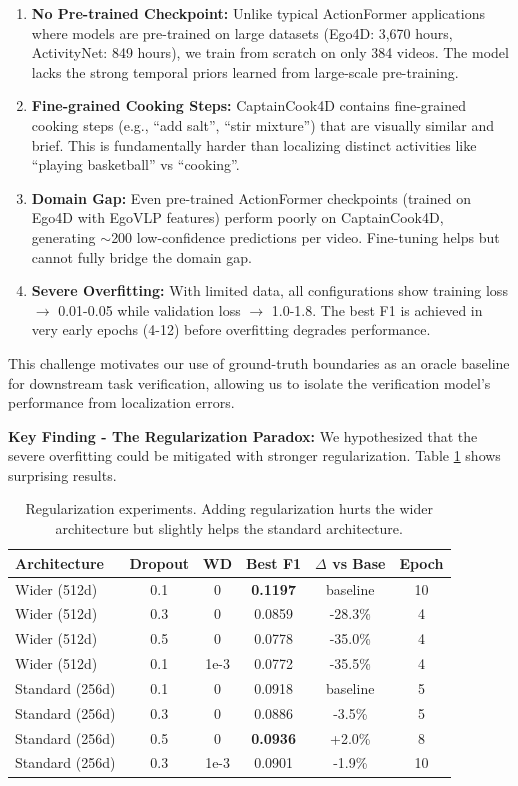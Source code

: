 \documentclass[10pt,twocolumn,letterpaper]{article}
\begin{document}
\begin{enumerate}
    \item \textbf{No Pre-trained Checkpoint:} Unlike typical ActionFormer applications where models are pre-trained on large datasets (Ego4D: 3,670 hours, ActivityNet: 849 hours), we train from scratch on only 384 videos. The model lacks the strong temporal priors learned from large-scale pre-training.
    
    \item \textbf{Fine-grained Cooking Steps:} CaptainCook4D contains fine-grained cooking steps (e.g., ``add salt'', ``stir mixture'') that are visually similar and brief. This is fundamentally harder than localizing distinct activities like ``playing basketball'' vs ``cooking''.
    
    \item \textbf{Domain Gap:} Even pre-trained ActionFormer checkpoints (trained on Ego4D with EgoVLP features) perform poorly on CaptainCook4D, generating $\sim$200 low-confidence predictions per video. Fine-tuning helps but cannot fully bridge the domain gap.
    
    \item \textbf{Severe Overfitting:} With limited data, all configurations show training loss $\rightarrow$ 0.01-0.05 while validation loss $\rightarrow$ 1.0-1.8. The best F1 is achieved in very early epochs (4-12) before overfitting degrades performance.
\end{enumerate}

This challenge motivates our use of ground-truth boundaries as an oracle baseline for downstream task verification, allowing us to isolate the verification model's performance from localization errors.

\textbf{Key Finding - The Regularization Paradox:} We hypothesized that the severe overfitting could be mitigated with stronger regularization. Table \ref{tab:regularization} shows surprising results.

\begin{table}[h]
\centering
\caption{Regularization experiments. Adding regularization hurts the wider architecture but slightly helps the standard architecture.}
\label{tab:regularization}
\begin{tabular}{lccccc}
\toprule
Architecture & Dropout & WD & Best F1 & $\Delta$ vs Base & Epoch \\
\midrule
Wider (512d) & 0.1 & 0 & \textbf{0.1197} & baseline & 10 \\
Wider (512d) & 0.3 & 0 & 0.0859 & -28.3\% & 4 \\
Wider (512d) & 0.5 & 0 & 0.0778 & -35.0\% & 4 \\
Wider (512d) & 0.1 & 1e-3 & 0.0772 & -35.5\% & 4 \\
\midrule
Standard (256d) & 0.1 & 0 & 0.0918 & baseline & 5 \\
Standard (256d) & 0.3 & 0 & 0.0886 & -3.5\% & 5 \\
Standard (256d) & 0.5 & 0 & \textbf{0.0936} & +2.0\% & 8 \\
Standard (256d) & 0.3 & 1e-3 & 0.0901 & -1.9\% & 10 \\
\bottomrule
\end{tabular}
\end{table}
\end{document}
